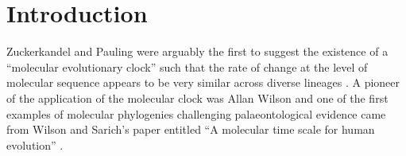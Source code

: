 \section{Introduction} 
Zuckerkandel and Pauling were arguably the first to suggest the existence of a ``molecular evolutionary clock'' such that the rate of change at the level of molecular sequence appears to be very similar across diverse lineages \cite{zuckerkandl1965}. A pioneer of the application of the molecular clock was Allan Wilson and one of the first examples of molecular phylogenies challenging palaeontological evidence came from Wilson and Sarich's paper entitled ``A molecular time scale for human evolution'' \cite{WilsonSarich1969}.
  
  
  
  
  
  